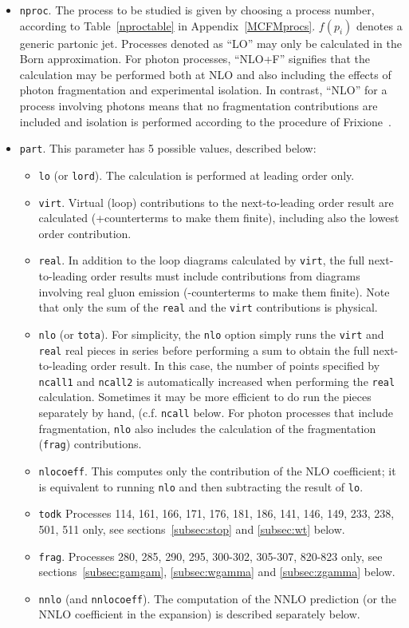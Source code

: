 \documentclass{article}
\begin{document}
\begin{itemize}
\item {\tt nproc}.
The process to be studied is given by
choosing a process number, according to Table~\ref{nproctable}
in Appendix~\ref{MCFMprocs}.
$f(p_i)$ denotes a generic partonic jet. Processes denoted as
``LO'' may only be calculated in the Born approximation. For photon
processes, ``NLO+F'' signifies that the calculation may be performed
both at NLO and also including the effects of photon fragmentation
and experimental isolation. In contrast, ``NLO'' for a process involving
photons means that no fragmentation contributions are included and isolation
is performed according to the procedure of Frixione~\cite{Frixione:1998jh}.
\item {\tt part}.
This parameter has 5 possible values, described below:
\begin{itemize}
\item {\tt lo} (or {\tt lord}).
The calculation is performed at leading order only.
\item {\tt virt}.
Virtual (loop) contributions to the next-to-leading order result are
calculated (+counterterms to make them finite), including also the
lowest order contribution.
\item {\tt real}.
In addition to the loop diagrams calculated by {\tt virt}, the full
next-to-leading order results must include contributions from diagrams
involving real gluon emission (-counterterms to make them finite).
Note that only the sum of the {\tt real} and the {\tt virt} contributions
is physical.
\item {\tt nlo} (or {\tt tota}).
For simplicity, the {\tt nlo} option simply runs the {\tt virt} and
{\tt real} real pieces in series before performing a sum to obtain
the full next-to-leading order result. In this case, the number of
points specified by {\tt ncall1} and {\tt ncall2} is automatically
increased when performing the {\tt real} calculation. Sometimes
it may be more efficient to do run the pieces separately by hand, 
(c.f. {\tt ncall} below. For photon processes that include fragmentation,
{\tt nlo} also includes the calculation of the fragmentation ({\tt frag})
contributions.
\item {\tt nlocoeff}.
This computes only the contribution of the NLO coefficient;  it is equivalent
to running {\tt nlo} and then subtracting the result of {\tt lo}.
\item {\tt todk}
Processes 114, 161, 166, 171, 176, 181, 186, 141, 146, 149, 233, 238, 501, 511 only, see sections~\ref{subsec:stop} and
\ref{subsec:wt} below.
\item {\tt frag}.
Processes 280, 285, 290, 295, 300-302, 305-307,  820-823 only, see sections~\ref{subsec:gamgam}, \ref{subsec:wgamma} and
\ref{subsec:zgamma} below.
\item {\tt nnlo} (and {\tt nnlocoeff}).
The computation of the NNLO prediction (or the NNLO coefficient in the
expansion) is described separately below.
\end{itemize}


\end{itemize}
\end{document}
